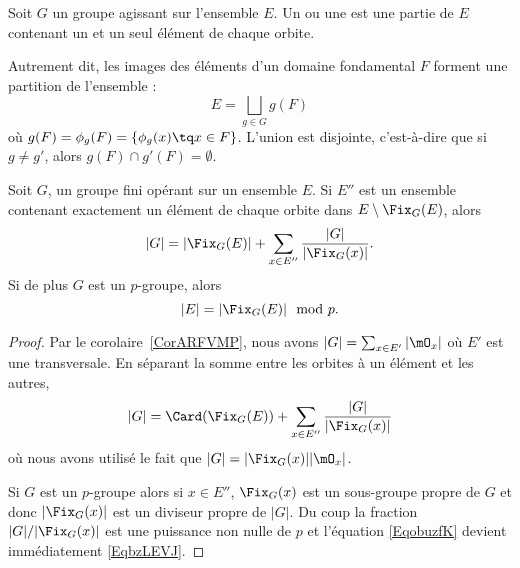\begin{definition}  \label{DefcSuYxz}
	Soit \( G\) un groupe agissant sur l'ensemble \( E\). Un  ou une  est une partie de \( E\) contenant un et un seul élément de chaque orbite.
\end{definition}
Autrement dit, les images des éléments d'un domaine fondamental \( F\) forment une partition de l'ensemble :
\begin{equation}
	E=\bigsqcup_{g\in G}g(F)
\end{equation}
où  \( g(F) = \phi_g(F) = \{ \phi_g(x) \tq x \in F\} \). L'union est disjointe, c'est-à-dire que si \( g\neq g'\), alors \( g(F)\cap g'(F)=\emptyset\).


\begin{proposition}       \label{PropUyLPdp}
	Soit \( G\), un groupe fini opérant sur un ensemble \( E\). Si \( E''\) est un ensemble contenant exactement un élément de chaque orbite dans \( E\setminus\Fix_G(E)\), alors
	\begin{equation}        \label{EqobuzfK}
		| G |=| \Fix_G(E) |+\sum_{x\in E''}\frac{ | G | }{ | \Fix_G(x) | }.
	\end{equation}
	Si de plus \( G\) est un $p$-groupe, alors
	\begin{equation}    \label{EqbzLEVJ}
		| E |=| \Fix_G(E) |\mod p.
	\end{equation}
\end{proposition}

\begin{proof}
	Par le corolaire~\ref{CorARFVMP}, nous avons \( | G |=\sum_{x\in E'}| \mO_x |\) où \( E'\) est une transversale.  En séparant la somme entre les orbites à un élément et les autres,
	\begin{equation}    \label{EqeggkBs}
		| G |=\Card(\Fix_G(E))+\sum_{x\in E''}\frac{ | G | }{ | \Fix_G(x) | }
	\end{equation}  \label{EqDgYbhm}
	où nous avons utilisé le fait que \( | G |=| \Fix_G(x) | |\mO_x |\).

	Si \( G\) est un \( p\)-groupe alors si \( x\in E''\), \( \Fix_G(x)\) est un sous-groupe propre de \( G\) et donc \( | \Fix_G(x) |\) est un diviseur propre de \( | G |\). Du coup la fraction \( | G |/|\Fix_G(x)|\) est une puissance non nulle de \( p\) et l'équation \eqref{EqobuzfK} devient immédiatement \eqref{EqbzLEVJ}.
\end{proof}

